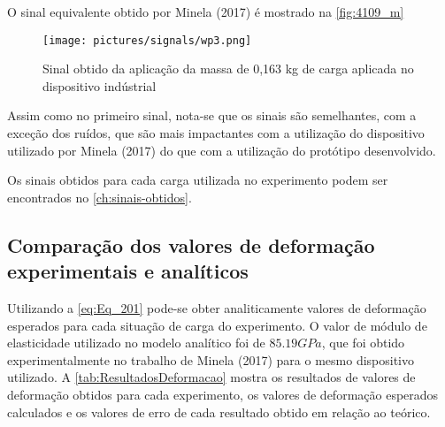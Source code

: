 O sinal equivalente obtido por Minela (2017) é mostrado na \autoref{fig:4109_m}

\begin{figure}[H]
	\caption{\label{fig:4109_m} Sinal obtido da aplicação da massa de 0,163 kg de carga aplicada no dispositivo indústrial}
	\begin{center}
		\texttt{[image: pictures/signals/wp3.png]}
	\end{center}
\end{figure}

Assim como no primeiro sinal, nota-se que os sinais são semelhantes, com a exceção dos ruídos, que são mais impactantes com 
a utilização do dispositivo utilizado por Minela (2017) do que com a utilização do protótipo desenvolvido.

Os sinais obtidos para cada carga utilizada no experimento podem ser encontrados no \autoref{ch:sinais-obtidos}.

\subsection{Comparação dos valores de deformação experimentais e analíticos}

Utilizando a \autoref{eq:Eq_201} pode-se obter analiticamente valores de deformação esperados para cada situação de carga do experimento.
O valor de módulo de elasticidade utilizado no modelo analítico foi de $ 85.19 GPa $, que foi obtido experimentalmente no trabalho de Minela (2017)
para o mesmo dispositivo utilizado.
A \autoref{tab:ResultadosDeformacao} mostra os resultados de valores de deformação obtidos para cada experimento, os valores de deformação esperados
calculados e os valores de erro de cada resultado obtido em relação ao teórico.

